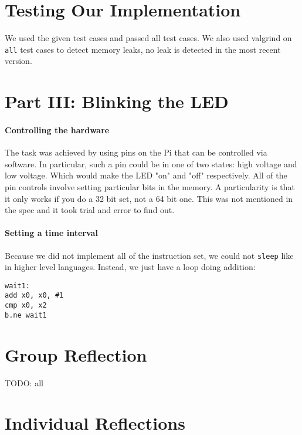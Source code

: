 \documentclass[11pt]{article}
\begin{document}
\section{Testing Our Implementation}

We used the given test cases and passed all test cases. We also used valgrind
on \texttt{all} test cases to detect memory leaks, no leak is detected in the
most recent version.

\section{Part III: Blinking the LED}
\paragraph{Controlling the hardware}
The task was achieved by using pins on the Pi that can be controlled via
software. In particular, such a pin could be in one of two states: high voltage
and low voltage. Which would make the LED "on" and "off" respectively. All of
the pin controls involve setting particular bits in the memory. A particularity
is that it only works if you do a 32 bit set, not a 64 bit one. This was not
mentioned in the spec and it took trial and error to find out.
\paragraph{Setting a time interval} Because we did not implement all of the
instruction set, we could not \texttt{sleep} like in higher level languages.
Instead, we just have a loop doing addition:

\begin{verbatim}
wait1:
add x0, x0, #1
cmp x0, x2
b.ne wait1
\end{verbatim}

\section{Group Reflection}

TODO: all\\

\section{Individual Reflections}
\end{document}
